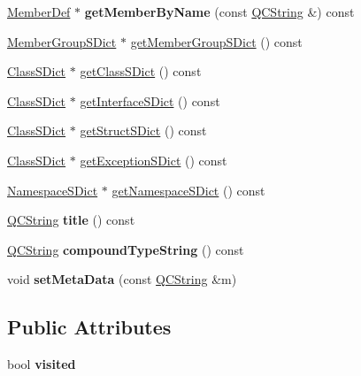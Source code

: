 \begin{DoxyCompactItemize}
\item 
\mbox{\label{class_namespace_def_afc62d5c2c695b2dcf46aa6971410eb04}} 
\mbox{\hyperlink{class_member_def}{Member\+Def}} $\ast$ {\bfseries get\+Member\+By\+Name} (const \mbox{\hyperlink{class_q_c_string}{Q\+C\+String}} \&) const
\item 
\mbox{\hyperlink{class_member_group_s_dict}{Member\+Group\+S\+Dict}} $\ast$ \mbox{\hyperlink{class_namespace_def_a10eb5409ddfcab44c5c7e918c4fd8ea9}{get\+Member\+Group\+S\+Dict}} () const
\item 
\mbox{\hyperlink{class_class_s_dict}{Class\+S\+Dict}} $\ast$ \mbox{\hyperlink{class_namespace_def_a7094dc9c0adb8fcfa6fbba05e1eeb045}{get\+Class\+S\+Dict}} () const
\item 
\mbox{\hyperlink{class_class_s_dict}{Class\+S\+Dict}} $\ast$ \mbox{\hyperlink{class_namespace_def_a1b3e2acf67bf2617ecb20bc0d9292276}{get\+Interface\+S\+Dict}} () const
\item 
\mbox{\hyperlink{class_class_s_dict}{Class\+S\+Dict}} $\ast$ \mbox{\hyperlink{class_namespace_def_a2e15bce8dc41ae7ec26240b6f07db41f}{get\+Struct\+S\+Dict}} () const
\item 
\mbox{\hyperlink{class_class_s_dict}{Class\+S\+Dict}} $\ast$ \mbox{\hyperlink{class_namespace_def_a48e0e9f760ca4e65c884e957d45f0fed}{get\+Exception\+S\+Dict}} () const
\item 
\mbox{\hyperlink{class_namespace_s_dict}{Namespace\+S\+Dict}} $\ast$ \mbox{\hyperlink{class_namespace_def_a75bbeb53b77a096551ddae14fa44729d}{get\+Namespace\+S\+Dict}} () const
\item 
\mbox{\label{class_namespace_def_a61bac67fa21f3e2646f8f71218bd0c97}} 
\mbox{\hyperlink{class_q_c_string}{Q\+C\+String}} {\bfseries title} () const
\item 
\mbox{\label{class_namespace_def_a3cef0a2667cb60708d1ca6b34fd7c629}} 
\mbox{\hyperlink{class_q_c_string}{Q\+C\+String}} {\bfseries compound\+Type\+String} () const
\item 
\mbox{\label{class_namespace_def_a9feb32c565054ace0bed287634424d3c}} 
void {\bfseries set\+Meta\+Data} (const \mbox{\hyperlink{class_q_c_string}{Q\+C\+String}} \&m)
\end{DoxyCompactItemize}
\subsection*{Public Attributes}
\begin{DoxyCompactItemize}
\item 
\mbox{\label{class_namespace_def_ae4831118e585d0852f159591c094fd0b}} 
bool {\bfseries visited}
\end{DoxyCompactItemize}
